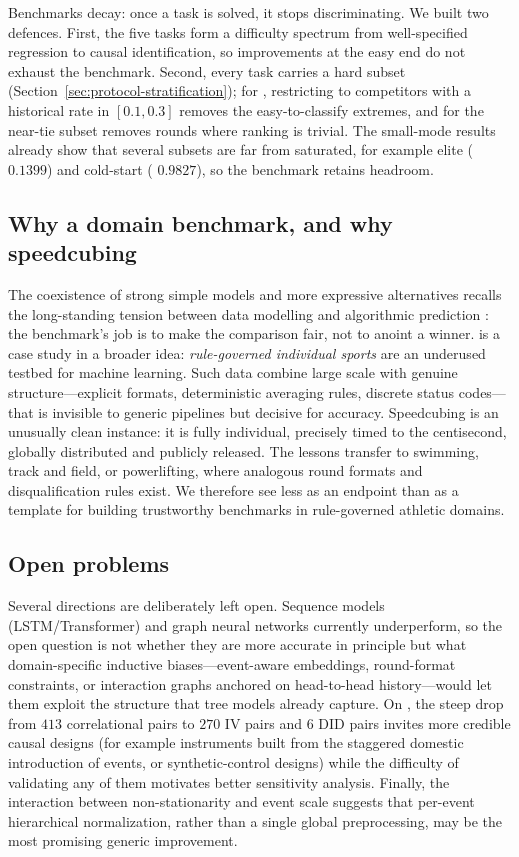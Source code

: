 Benchmarks decay: once a task is solved, it stops discriminating. We built two
defences. First, the five tasks form a difficulty spectrum from well-specified
regression to causal identification, so improvements at the easy end do not
exhaust the benchmark. Second, every task carries a hard subset
(Section~\ref{sec:protocol-stratification}); for , restricting to
competitors with a historical \DNF{} rate in $[0.1,0.3]$ removes the
easy-to-classify extremes, and for  the near-tie subset removes rounds
where ranking is trivial. The small-mode results already show that several
subsets are far from saturated, for example elite  (\aucpr{}
$0.1399$) and cold-start  (\maelog{} $0.9827$), so the benchmark retains
headroom.

\subsection{Why a domain benchmark, and why speedcubing}
\label{sec:disc-domain}

The coexistence of strong simple models and more expressive alternatives
recalls the long-standing tension between data modelling and algorithmic
prediction \citep{breiman_cultures}: the benchmark's job is to make the
comparison fair, not to anoint a winner. \wcabench{} is a case study in a
broader idea: \emph{rule-governed individual sports} are an underused testbed
for machine learning. Such data combine large scale with genuine
structure---explicit formats, deterministic averaging rules, discrete status
codes---that is invisible to generic pipelines but decisive for accuracy.
Speedcubing is an unusually clean instance: it is fully individual, precisely
timed to the centisecond, globally distributed and publicly released. The
lessons transfer to swimming, track and field, or powerlifting, where analogous
round formats and disqualification rules exist. We therefore see \wcabench{}
less as an endpoint than as a template for building trustworthy benchmarks in
rule-governed athletic domains.

\subsection{Open problems}
\label{sec:disc-open}

Several directions are deliberately left open. Sequence models
(LSTM/Transformer) and graph neural networks currently underperform, so the open
question is not whether they are more accurate in principle but what
domain-specific inductive biases---event-aware embeddings, round-format
constraints, or interaction graphs anchored on head-to-head history---would let
them exploit the structure that tree models already capture. On , the
steep drop from $413$ correlational pairs to $270$ IV pairs and $6$ DID pairs
invites more credible causal designs (for example instruments built from the
staggered domestic introduction of events, or synthetic-control designs) while
the difficulty of validating any of them motivates better sensitivity analysis.
Finally, the interaction between non-stationarity and event scale suggests that
per-event hierarchical normalization, rather than a single global
preprocessing, may be the most promising generic improvement.
